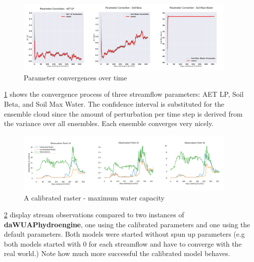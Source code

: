 \begin{figure}[h]
    \centering
    \includegraphics[width=0.95\textwidth]{param}
    \caption{Parameter convergences over time}
    \label{fig:param}
\end{figure} 

\ref{fig:param} shows the convergence process of three streamflow parameters: AET LP, Soil Beta, and Soil Max Water. The confidence interval is substituted for the ensemble cloud since the amount of perturbation per time step is derived from the variance over all ensembles. Each ensemble converges very nicely.

\begin{figure}[h]
    \centering
    \includegraphics[width=0.95\textwidth]{cali}
    \caption{A calibrated raster - maximum water capacity}
    \label{fig:cali}
\end{figure} 

\ref{fig:cali} display stream observations compared to two instances of \textbf{daWUAPhydroengine}, one using the calibrated parameters and one using the default parameters. Both models were started without spun up parameters (e.g both models started with 0 for each streamflow and have to converge with the real world.) Note how much more successful the calibrated model behaves.

